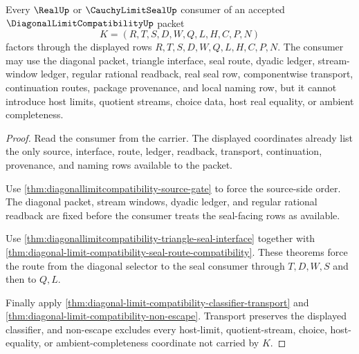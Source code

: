 \begin{theorem}
\label{thm:diagonallimitcompatibility-downstream-consumer-gate}
Every $\RealUp$ or $\CauchyLimitSealUp$ consumer of an accepted $\DiagonalLimitCompatibilityUp$ packet
$$
K=(R,T,S,D,W,Q,L,H,C,P,N)
$$
factors through the displayed rows $R,T,S,D,W,Q,L,H,C,P,N$. The consumer may use the diagonal packet, triangle interface, seal route, dyadic ledger, stream-window ledger, regular rational readback, real seal row, componentwise transport, continuation routes, package provenance, and local naming row, but it cannot introduce host limits, quotient streams, choice data, host real equality, or ambient completeness.
\end{theorem}
\begin{proof}
Read the consumer from the carrier. The displayed coordinates already list the only source, interface, route, ledger, readback, transport, continuation, provenance, and naming rows available to the packet.

Use \autoref{thm:diagonallimitcompatibility-source-gate} to force the source-side order. The diagonal packet, stream windows, dyadic ledger, and regular rational readback are fixed before the consumer treats the seal-facing rows as available.

Use \autoref{thm:diagonallimitcompatibility-triangle-seal-interface} together with \autoref{thm:diagonal-limit-compatibility-seal-route-compatibility}. These theorems force the route from the diagonal selector to the seal consumer through $T,D,W,S$ and then to $Q,L$.

Finally apply \autoref{thm:diagonal-limit-compatibility-classifier-transport} and \autoref{thm:diagonal-limit-compatibility-non-escape}. Transport preserves the displayed classifier, and non-escape excludes every host-limit, quotient-stream, choice, host-equality, or ambient-completeness coordinate not carried by $K$.
\end{proof}

